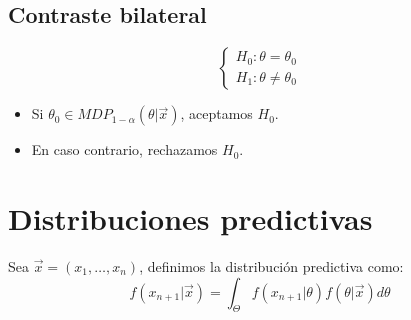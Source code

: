 \subsection*{Contraste bilateral}
$$\begin{cases}
        H_0: \theta = \theta_0 \\
        H_1: \theta \neq \theta_0
    \end{cases}$$
\begin{itemize}
    \item Si $\theta_0 \in MDP_{1-\alpha}(\theta|\vec{x})$, aceptamos $H_0$.
    \item En caso contrario, rechazamos $H_0$.
\end{itemize}

\section{Distribuciones predictivas}
Sea $\vec{x} = (x_1, \dots, x_n)$, definimos la distribución predictiva como:
$$f(x_{n+1}|\vec{x}) = \int_\Theta f(x_{n+1}|\theta)f(\theta|\vec{x})d\theta$$

